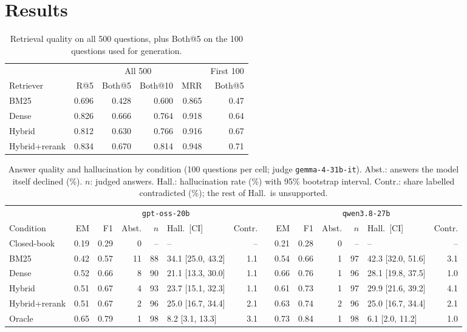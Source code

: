 \documentclass[10pt,a4paper,twocolumn]{article}
\newcommand{\model}[1]{\texttt{#1}}
\begin{document}
\section{Results}

\begin{table}[t]
\centering\small
\caption{Retrieval quality on all 500 questions, plus Both@5 on the 100 questions used for generation.}\label{tab:retrieval}
\begin{tabular}{@{}lrrrrr@{}}
\toprule
 & \multicolumn{4}{c}{All 500} & First 100 \\
\cmidrule(lr){2-5}
Retriever & R@5 & Both@5 & Both@10 & MRR & Both@5 \\
\midrule
BM25 & 0.696 & 0.428 & 0.600 & 0.865 & 0.47 \\
Dense & 0.826 & 0.666 & 0.764 & 0.918 & 0.64 \\
Hybrid & 0.812 & 0.630 & 0.766 & 0.916 & 0.67 \\
Hybrid+rerank & 0.834 & 0.670 & 0.814 & 0.948 & 0.71 \\
\bottomrule
\end{tabular}
\end{table}

\begin{table}[t]
\centering\footnotesize
\caption{Answer quality and hallucination by condition (100 questions per cell; judge \model{gemma-4-31b-it}). Abst.: answers the model
itself declined (\%). $n$: judged answers. Hall.: hallucination rate (\%) with 95\% bootstrap interval. Contr.: share labelled
contradicted (\%); the rest of Hall.\ is unsupported.}\label{tab:main}
\begin{tabular}{@{}lrrrrlrcrrrrlr@{}}
\toprule
 & \multicolumn{6}{c}{\model{gpt-oss-20b}} & & \multicolumn{6}{c}{\model{qwen3.8-27b}} \\
\cmidrule{2-7}\cmidrule{9-14}
Condition & EM & F1 & Abst. & $n$ & Hall.\ [CI] & Contr. & & EM & F1 & Abst. & $n$ & Hall.\ [CI] & Contr. \\
\midrule
Closed-book & 0.19 & 0.29 & 0 & -- & -- & -- & & 0.21 & 0.28 & 0 & -- & -- & -- \\
BM25 & 0.42 & 0.57 & 11 & 88 & 34.1 [25.0, 43.2] & 1.1 & & 0.54 & 0.66 & 1 & 97 & 42.3 [32.0, 51.6] & 3.1 \\
Dense & 0.52 & 0.66 & 8 & 90 & 21.1 [13.3, 30.0] & 1.1 & & 0.66 & 0.76 & 1 & 96 & 28.1 [19.8, 37.5] & 1.0 \\
Hybrid & 0.51 & 0.67 & 4 & 93 & 23.7 [15.1, 32.3] & 1.1 & & 0.61 & 0.73 & 1 & 97 & 29.9 [21.6, 39.2] & 4.1 \\
Hybrid+rerank & 0.51 & 0.67 & 2 & 96 & 25.0 [16.7, 34.4] & 2.1 & & 0.63 & 0.74 & 2 & 96 & 25.0 [16.7, 34.4] & 2.1 \\
Oracle & 0.65 & 0.79 & 1 & 98 & 8.2 [3.1, 13.3] & 3.1 & & 0.73 & 0.84 & 1 & 98 & 6.1 [2.0, 11.2] & 1.0 \\
\bottomrule
\end{tabular}
\end{table}
\end{document}
